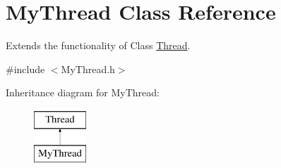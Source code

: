 \hypertarget{class_my_thread}{\section{My\-Thread Class Reference}
\label{class_my_thread}
}


Extends the functionality of Class \hyperlink{class_thread}{Thread}.  




{\ttfamily \#include $<$My\-Thread.\-h$>$}

Inheritance diagram for My\-Thread\-:\begin{figure}[H]
\begin{center}
\leavevmode
\includegraphics[height=2.000000cm]{class_my_thread}
\end{center}
\end{figure}
